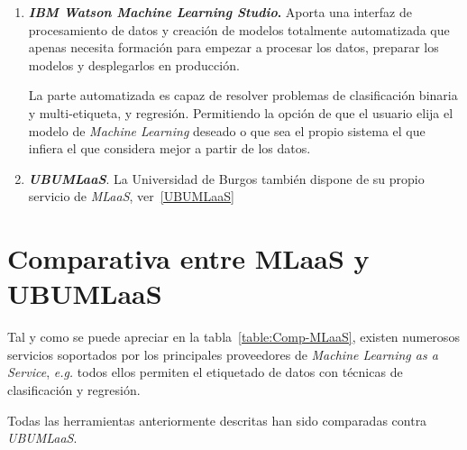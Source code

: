 \begin{enumerate}
\item \textbf{\textit{IBM Watson Machine Learning Studio}.}
Aporta una interfaz de procesamiento de datos y creación de modelos totalmente automatizada que apenas necesita formación para empezar a procesar los datos, preparar los modelos y desplegarlos en producción.

La parte automatizada es capaz de resolver problemas de clasificación binaria y multi-etiqueta, y regresión. Permitiendo la opción de que el usuario elija el modelo de \textit{Machine Learning} deseado o que sea el propio sistema el que infiera el que considera mejor a partir de los datos.

\item \textbf{\textit{UBUMLaaS}}. La Universidad de Burgos también dispone de su propio servicio de \textit{MLaaS}, ver~\ref{UBUMLaaS}

\end{enumerate}
\clearpage
\section{Comparativa entre MLaaS y UBUMLaaS}
Tal y como se puede apreciar en la tabla~\ref{table:Comp-MLaaS}, existen numerosos servicios soportados por los principales proveedores de \textit{Machine Learning as a Service}, \textit{\textit{e.g.}} todos ellos permiten el etiquetado de datos con técnicas de clasificación y regresión. 

Todas las herramientas anteriormente descritas han sido comparadas contra \textit{UBUMLaaS}. 

